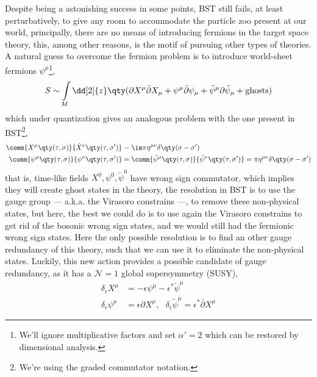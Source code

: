 Despite being a astonishing success in some points, BST still fails, at least perturbatively, to give 
any room to accommodate the particle zoo present at our world, principally, there are no means of 
introducing fermions in the target space theory, this, among other reasons, is the motif of pursuing other 
types of theories. A natural guess to overcome the fermion problem is to introduce world-sheet fermions $\psi^\mu$\cite{polchinski:vol2,witten:vol1}\footnote{We'll ignore multiplicative 
factors and set $\alpha'=2$ which can be restored by dimensional analysis.}, 
\begin{align}
    S\sim\int\limits_M\dd[2]{z}\qty(\partial X^\mu\bar\partial X_\mu+\psi^\mu\bar\partial\psi_{\mu}+{\tilde\psi}^\mu\partial{\tilde\psi}_{\mu}+\textnormal{ghosts})\label{action:sst1}
\end{align}
which under quantization gives an analogous problem with the one present in BST\footnote{We're using the graded commutator notation.},
\begin{align*}
    \comm{X^\mu\qty(\tau,\sigma)}{\dot X^\nu\qty(\tau,\sigma')}&=\im\pi\eta^{\mu\nu}\delta\qty(\sigma-\sigma')\\
    \comm{\psi^\mu\qty(\tau,\sigma)}{\psi^\nu\qty(\tau,\sigma')}&=\comm{{\tilde\psi}^\mu\qty(\tau,\sigma)}{{\tilde\psi}^\nu\qty(\tau,\sigma')}=\pi\eta^{\mu\nu}\delta\qty(\sigma-\sigma')
\end{align*}
that is, time-like fields $X^0,\psi^0,{\tilde\psi}^0$ have wrong sign commutator, which implies they will create ghost states in 
the theory, the resolution in BST is to use the gauge group --- a.k.a. the Virasoro constrains ---, to remove 
these non-physical states, but here, the best we could do is to use again the Virasoro constrains to get rid of the 
bosonic wrong sign states, and we would still had the fermionic wrong sign states. Here the only possible resolution 
is to find an other gauge redundancy of this theory, such that we can use it to eliminate the non-physical states. 
Luckily, this new action provides a possible candidate of gauge redundancy, as it has a $\mathcal N=1$ global supersymmetry (SUSY),\begin{subequations}
\label{susy:pol1}\begin{align}
    \delta_\epsilon X^\mu&=-\epsilon\psi^\mu-\epsilon^\ast{\tilde\psi^\mu}\\
    \delta_\epsilon\psi^\mu&=\epsilon\partial X^\mu,\ \ \ \delta_\epsilon{\tilde\psi}^\mu=\epsilon^\ast\bar\partial X^\mu
\end{align}\end{subequations}

